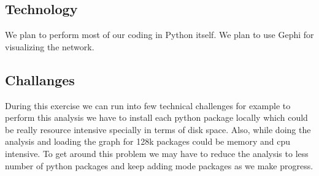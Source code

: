 \subsection{Technology} \label{tech}
 We plan to perform most of our coding in Python itself. We plan to use Gephi
  for visualizing the network.


\subsection{Challanges} \label{techchallanges}
During this exercise we can run into few technical challenges for example
to perform this analysis we have to install each python package locally
which could be really resource intensive specially in terms of disk space.
Also, while doing the analysis and loading the graph for 128k packages
could be memory and cpu intensive. To get around this problem we may 
have to reduce the analysis to less number of python packages and keep
adding mode packages as we make progress.